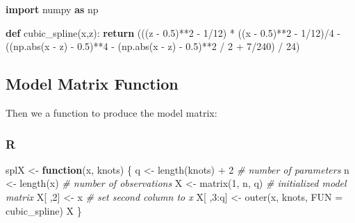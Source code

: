 \documentclass[
  letterpaper,
]{krantz}
\newenvironment{Shaded}{}{}
\newcommand{\AttributeTok}[1]{\textcolor[rgb]{0.49,0.56,0.16}{#1}}
\newcommand{\BuiltInTok}[1]{\textcolor[rgb]{0.00,0.50,0.00}{#1}}
\newcommand{\CommentTok}[1]{\textcolor[rgb]{0.38,0.63,0.69}{\textit{#1}}}
\newcommand{\ControlFlowTok}[1]{\textcolor[rgb]{0.00,0.44,0.13}{\textbf{#1}}}
\newcommand{\DecValTok}[1]{\textcolor[rgb]{0.25,0.63,0.44}{#1}}
\newcommand{\FloatTok}[1]{\textcolor[rgb]{0.25,0.63,0.44}{#1}}
\newcommand{\FunctionTok}[1]{\textcolor[rgb]{0.02,0.16,0.49}{#1}}
\newcommand{\ImportTok}[1]{\textcolor[rgb]{0.00,0.50,0.00}{\textbf{#1}}}
\newcommand{\KeywordTok}[1]{\textcolor[rgb]{0.00,0.44,0.13}{\textbf{#1}}}
\newcommand{\NormalTok}[1]{#1}
\newcommand{\OperatorTok}[1]{\textcolor[rgb]{0.40,0.40,0.40}{#1}}
\newcommand{\OtherTok}[1]{\textcolor[rgb]{0.00,0.44,0.13}{#1}}
\newcommand{\SpecialCharTok}[1]{\textcolor[rgb]{0.25,0.44,0.63}{#1}}
\begin{document}
\begin{Shaded}
\begin{Highlighting}[]
\ImportTok{import}\NormalTok{ numpy }\ImportTok{as}\NormalTok{ np}

\KeywordTok{def}\NormalTok{ cubic\_spline(x,z):}
    \ControlFlowTok{return}\NormalTok{ (((z }\OperatorTok{{-}} \FloatTok{0.5}\NormalTok{)}\OperatorTok{**}\DecValTok{2} \OperatorTok{{-}} \DecValTok{1}\OperatorTok{/}\DecValTok{12}\NormalTok{) }\OperatorTok{*}\NormalTok{ ((x }\OperatorTok{{-}} \FloatTok{0.5}\NormalTok{)}\OperatorTok{**}\DecValTok{2} \OperatorTok{{-}} \DecValTok{1}\OperatorTok{/}\DecValTok{12}\NormalTok{)}\OperatorTok{/}\DecValTok{4} \OperatorTok{{-}}
\NormalTok{            ((np.}\BuiltInTok{abs}\NormalTok{(x }\OperatorTok{{-}}\NormalTok{ z) }\OperatorTok{{-}} \FloatTok{0.5}\NormalTok{)}\OperatorTok{**}\DecValTok{4} \OperatorTok{{-}}\NormalTok{ (np.}\BuiltInTok{abs}\NormalTok{(x }\OperatorTok{{-}}\NormalTok{ z) }\OperatorTok{{-}} \FloatTok{0.5}\NormalTok{)}\OperatorTok{**}\DecValTok{2} \OperatorTok{/} \DecValTok{2} \OperatorTok{+} \DecValTok{7}\OperatorTok{/}\DecValTok{240}\NormalTok{) }\OperatorTok{/} \DecValTok{24}\NormalTok{)}
\end{Highlighting}
\end{Shaded}

\subsection{Model Matrix Function}\label{model-matrix-function}

Then we a function to produce the model matrix:

\subsubsection{R}

\begin{Shaded}
\begin{Highlighting}[]
\NormalTok{splX }\OtherTok{\textless{}{-}} \ControlFlowTok{function}\NormalTok{(x, knots) \{}
\NormalTok{  q }\OtherTok{\textless{}{-}} \FunctionTok{length}\NormalTok{(knots) }\SpecialCharTok{+} \DecValTok{2}        \CommentTok{\# number of parameters}
\NormalTok{  n }\OtherTok{\textless{}{-}} \FunctionTok{length}\NormalTok{(x)                }\CommentTok{\# number of observations}
\NormalTok{  X }\OtherTok{\textless{}{-}} \FunctionTok{matrix}\NormalTok{(}\DecValTok{1}\NormalTok{, n, q)          }\CommentTok{\# initialized model matrix}
\NormalTok{  X[ ,}\DecValTok{2}\NormalTok{] }\OtherTok{\textless{}{-}}\NormalTok{ x                   }\CommentTok{\# set second column to x}
\NormalTok{  X[ ,}\DecValTok{3}\SpecialCharTok{:}\NormalTok{q] }\OtherTok{\textless{}{-}} \FunctionTok{outer}\NormalTok{(x, knots, }\AttributeTok{FUN =}\NormalTok{ cubic\_spline) }
\NormalTok{  X}
\NormalTok{\}}
\end{Highlighting}
\end{Shaded}
\end{document}
